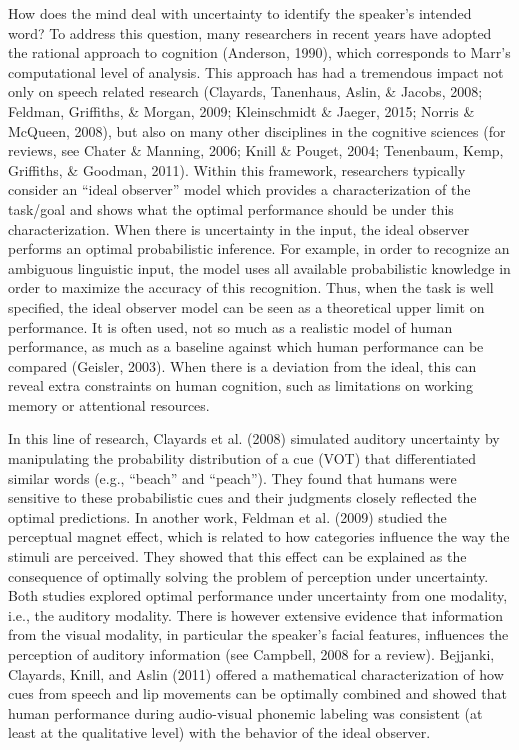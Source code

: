 \documentclass[english,man]{apa6}
\theoremstyle{definition}
\theoremstyle{definition}
\theoremstyle{definition}
\theoremstyle{remark}
\begin{document}
How does the mind deal with uncertainty to identify the speaker's
intended word? To address this question, many researchers in recent
years have adopted the rational approach to cognition (Anderson, 1990),
which corresponds to Marr's computational level of analysis. This
approach has had a tremendous impact not only on speech related research
(Clayards, Tanenhaus, Aslin, \& Jacobs, 2008; Feldman, Griffiths, \&
Morgan, 2009; Kleinschmidt \& Jaeger, 2015; Norris \& McQueen, 2008),
but also on many other disciplines in the cognitive sciences (for
reviews, see Chater \& Manning, 2006; Knill \& Pouget, 2004; Tenenbaum,
Kemp, Griffiths, \& Goodman, 2011). Within this framework, researchers
typically consider an \enquote{ideal observer} model which provides a
characterization of the task/goal and shows what the optimal performance
should be under this characterization. When there is uncertainty in the
input, the ideal observer performs an optimal probabilistic inference.
For example, in order to recognize an ambiguous linguistic input, the
model uses all available probabilistic knowledge in order to maximize
the accuracy of this recognition. Thus, when the task is well specified,
the ideal observer model can be seen as a theoretical upper limit on
performance. It is often used, not so much as a realistic model of human
performance, as much as a baseline against which human performance can
be compared (Geisler, 2003). When there is a deviation from the ideal,
this can reveal extra constraints on human cognition, such as
limitations on working memory or attentional resources.

In this line of research, Clayards et al. (2008) simulated auditory
uncertainty by manipulating the probability distribution of a cue (VOT)
that differentiated similar words (e.g., \enquote{beach} and
\enquote{peach}). They found that humans were sensitive to these
probabilistic cues and their judgments closely reflected the optimal
predictions. In another work, Feldman et al. (2009) studied the
perceptual magnet effect, which is related to how categories influence
the way the stimuli are perceived. They showed that this effect can be
explained as the consequence of optimally solving the problem of
perception under uncertainty. Both studies explored optimal performance
under uncertainty from one modality, i.e., the auditory modality. There
is however extensive evidence that information from the visual modality,
in particular the speaker's facial features, influences the perception
of auditory information (see Campbell, 2008 for a review). Bejjanki,
Clayards, Knill, and Aslin (2011) offered a mathematical
characterization of how cues from speech and lip movements can be
optimally combined and showed that human performance during audio-visual
phonemic labeling was consistent (at least at the qualitative level)
with the behavior of the ideal observer.
\end{document}
